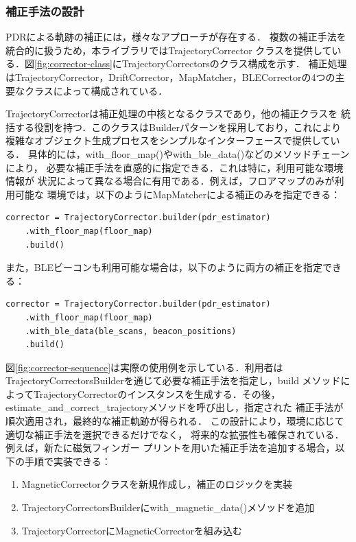 
\subsubsection{補正手法の設計}


PDRによる軌跡の補正には，様々なアプローチが存在する．
複数の補正手法を統合的に扱うため，本ライブラリではTrajectoryCorrector
クラスを提供している．図\ref{fig:corrector-class}にTrajectoryCorrectorsのクラス構成を示す．
補正処理はTrajectoryCorrector，DriftCorrector，MapMatcher，BLECorrectorの4つの主要なクラスによって構成されている．

TrajectoryCorrectorは補正処理の中核となるクラスであり，他の補正クラスを
統括する役割を持つ．このクラスはBuilderパターンを採用しており，これにより
複雑なオブジェクト生成プロセスをシンプルなインターフェースで提供している．
具体的には，with\_floor\_map()やwith\_ble\_data()などのメソッドチェーンにより，
必要な補正手法を直感的に指定できる．これは特に，利用可能な環境情報が
状況によって異なる場合に有用である．例えば，フロアマップのみが利用可能な
環境では，以下のようにMapMatcherによる補正のみを指定できる：

\begin{lstlisting}
corrector = TrajectoryCorrector.builder(pdr_estimator)
    .with_floor_map(floor_map)
    .build()
\end{lstlisting}

また，BLEビーコンも利用可能な場合は，以下のように両方の補正を指定できる：

\begin{lstlisting}
corrector = TrajectoryCorrector.builder(pdr_estimator)
    .with_floor_map(floor_map)
    .with_ble_data(ble_scans, beacon_positions)
    .build()
\end{lstlisting}


図\ref{fig:corrector-sequence}は実際の使用例を示している．利用者は
TrajectoryCorrectorsBuilderを通じて必要な補正手法を指定し，build
メソッドによってTrajectoryCorrectorのインスタンスを生成する．その後，
estimate\_and\_correct\_trajectoryメソッドを呼び出し，指定された
補正手法が順次適用され，最終的な補正軌跡が得られる．
この設計により，環境に応じて適切な補正手法を選択できるだけでなく，
将来的な拡張性も確保されている．例えば，新たに磁気フィンガー
プリントを用いた補正手法を追加する場合，以下の手順で実装できる：

\begin{enumerate}
  \item MagneticCorrectorクラスを新規作成し，補正のロジックを実装
  \item TrajectoryCorrectorsBuilderにwith\_magnetic\_data()メソッドを追加
  \item TrajectoryCorrectorにMagneticCorrectorを組み込む
\end{enumerate}

